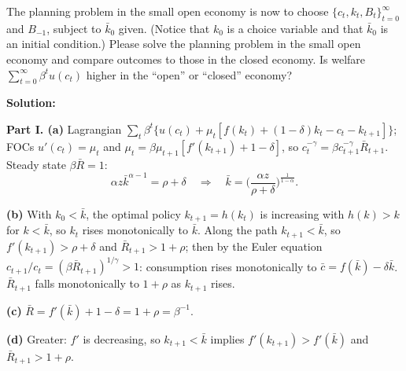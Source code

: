 \documentclass[12pt, letterpaper]{article}
\newcommand{\Rb}{\bar R}
\newcommand{\kb}{\bar k}
\newcommand{\cb}{\bar c}
\begin{document}
\begin{tcolorbox}[evenbox,title={Exercise 11.6 \quad Trade and growth}]
\begin{tcolorbox}[questionbox]
The planning problem in the small open economy is now to choose $\{c_t,k_t,B_t\}_{t=0}^\infty$ and $B_{-1}$, subject to
$\bar k_0$ given. (Notice that $k_0$ is a choice variable and that $\bar k_0$ is an initial condition.) Please solve the
planning problem in the small open economy and compare outcomes to those in the closed economy. Is welfare
$\sum_{t=0}^\infty\beta^tu(c_t)$ higher in the ``open'' or ``closed'' economy?
\end{tcolorbox}

\textbf{Solution:}

\textbf{Part I. (a)} Lagrangian $\sum_t\beta^t\{u(c_t)+\mu_t[f(k_t)+(1-\delta)k_t-c_t-k_{t+1}]\}$; FOCs $u'(c_t)=\mu_t$ and
$\mu_t=\beta\mu_{t+1}[f'(k_{t+1})+1-\delta]$, so $c_t^{-\gamma}=\beta c_{t+1}^{-\gamma}\Rb_{t+1}$. Steady state
$\beta\Rb=1$:
\[
\alpha z\kb^{\alpha-1}=\rho+\delta\quad\Rightarrow\quad\kb=\Big(\frac{\alpha z}{\rho+\delta}\Big)^{\frac1{1-\alpha}}.
\]

\textbf{(b)} With $k_0<\kb$, the optimal policy $k_{t+1}=h(k_t)$ is increasing with $h(k)>k$ for $k<\kb$, so $k_t$ rises
monotonically to $\kb$. Along the path $k_{t+1}<\kb$, so $f'(k_{t+1})>\rho+\delta$ and $\Rb_{t+1}>1+\rho$; then by the
Euler equation $c_{t+1}/c_t=(\beta\Rb_{t+1})^{1/\gamma}>1$: consumption rises monotonically to
$\cb=f(\kb)-\delta\kb$. $\Rb_{t+1}$ falls monotonically to $1+\rho$ as $k_{t+1}$ rises.

\textbf{(c)} $\Rb=f'(\kb)+1-\delta=1+\rho=\beta^{-1}$.

\textbf{(d)} Greater: $f'$ is decreasing, so $k_{t+1}<\kb$ implies $f'(k_{t+1})>f'(\kb)$ and $\Rb_{t+1}>1+\rho$.


\end{tcolorbox}
\end{document}
